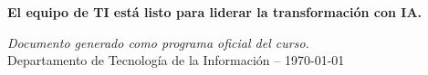 \documentclass[11pt,a4paper]{article}
\begin{document}
\vspace{0.5cm}
\begin{center}
  \begin{tcolorbox}[enhanced, width=0.85\linewidth, colback=verde!8, colframe=verde,
      boxrule=0.5pt, halign=center, sharp corners]
    \large\textbf{El equipo de TI está listo para liderar la transformación con IA.}
  \end{tcolorbox}
\end{center}

\vfill
\begin{center}
  \small\color{textoGris}%
  \emph{Documento generado como programa oficial del curso.}\\
  Departamento de Tecnología de la Información -- \today
\end{center}
\end{document}
